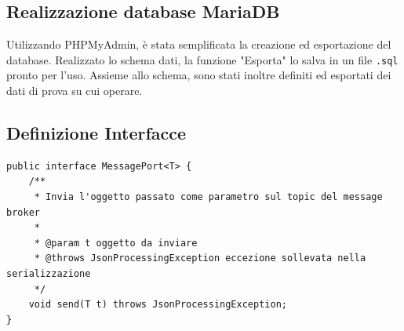 \subsection{Realizzazione database MariaDB}
Utilizzando PHPMyAdmin, è stata semplificata la creazione ed esportazione del database. Realizzato lo schema dati, la funzione "Esporta" lo salva in un file \texttt{.sql} 
pronto per l'uso. Assieme allo schema, sono stati inoltre definiti ed esportati dei dati di prova su cui operare.





\subsection{Definizione Interfacce}
\begin{lstlisting}[style=myJava, 
    caption={Interfaccia MessagePort}, label=lst:messageport, emph={[3] send},
    emphstyle={[3]\color{codeCyan}}]
public interface MessagePort<T> {
    /**
     * Invia l'oggetto passato come parametro sul topic del message broker
     *
     * @param t oggetto da inviare
     * @throws JsonProcessingException eccezione sollevata nella serializzazione
     */
    void send(T t) throws JsonProcessingException;
}
\end{lstlisting}

